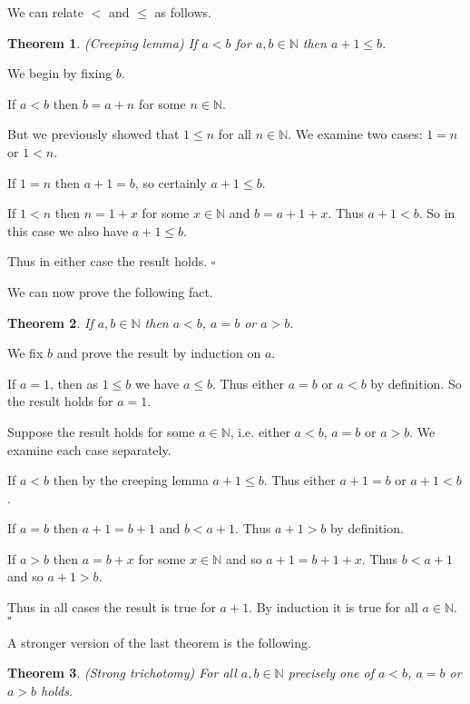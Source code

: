 \documentclass[10pt]{article}
\newcommand{\N}{\mathbb{N}}
\newcommand{\qed}{\square}
\newtheorem{theorem}{Theorem}[section]
\newenvironment{proof}[1][Proof]{\begin{trivlist}
\item[\hskip \labelsep {\bfseries #1}]}{\end{trivlist}}
\begin{document}
We can relate $<$ and $\leq$ as follows.

\begin{theorem} (Creeping lemma)
If $a < b$ for $a, b \in \N$ then $a + 1 \leq b$.
\end{theorem}

\begin{proof}
We begin by fixing $b$.

If $a < b$ then $b = a + n$ for some $n \in \N$.

But we previously showed that $1 \leq n$ for all $n \in \N$. We examine two cases: $1 = n$ or $1 < n$.

If $1 = n$ then $a + 1 = b$, so certainly $a + 1 \leq b$.

If $1 < n$ then $n = 1 + x$ for some $x \in \N$ and $b = a + 1 + x$. Thus $a + 1 < b$. So in this case we also have $a + 1 \leq b$.

Thus in either case the result holds. $\qed$
\end{proof}

We can now prove the following fact.

\begin{theorem}
If $a, b \in \N$ then $a < b$, $a = b$ or $a > b$.
\end{theorem}

\begin{proof}
We fix $b$ and prove the result by induction on $a$.

If $a = 1$, then as $1 \leq b$ we have $a \leq b$. Thus either $a = b$ or $a < b$ by definition. So the result holds for $a = 1$.

Suppose the result holds for some $a \in \N$, i.e. either $a < b$, $a = b$ or $a > b$. We examine each case separately.

If $a < b$ then by the creeping lemma $a + 1 \leq b$. Thus either $a + 1 = b$ or $a + 1 < b$.

If $a = b$ then $a + 1 = b + 1$ and $b < a + 1$. Thus $a + 1 > b$ by definition.

If $a > b$ then $a = b + x$ for some $x \in \N$ and so $a + 1 = b + 1 + x$. Thus $b < a + 1$ and so $a + 1 > b$.

Thus in all cases the result is true for $a + 1$. By induction it is true for all $a \in \N$. $\qed$
\end{proof}

A stronger version of the last theorem is the following.

\begin{theorem} (Strong trichotomy)
For all $a, b \in \N$ precisely one of $a < b$, $a = b$ or $a > b$ holds.
\end{theorem}
\end{document}
